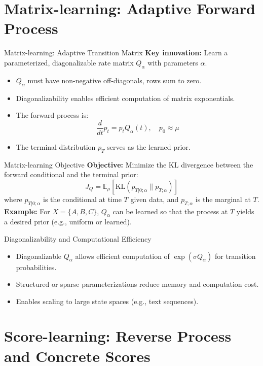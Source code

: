 \documentclass{beamer}
\begin{document}
\section{Matrix-learning: Adaptive Forward Process}

\begin{frame}{Matrix-learning: Adaptive Transition Matrix}
  \textbf{Key innovation:} Learn a parameterized, diagonalizable rate matrix $Q_\alpha$ with parameters $\alpha$.
  \begin{itemize}
    \item $Q_\alpha$ must have non-negative off-diagonals, rows sum to zero.
    \item Diagonalizability enables efficient computation of matrix exponentials.
    \item The forward process is:
      \[
        \frac{d}{dt} p_t = p_t Q_\alpha(t), \quad p_0 \approx \mu
      \]
    \item The terminal distribution $p_T$ serves as the learned prior.
  \end{itemize}
\end{frame}

\begin{frame}{Matrix-learning Objective}
  \textbf{Objective:} Minimize the KL divergence between the forward conditional and the terminal prior:
  \[
    J_Q = \mathbb{E}_\mu \left[ \mathrm{KL}(p_{T|0;\alpha} \| p_{T;\alpha}) \right]
  \]
  where $p_{T|0;\alpha}$ is the conditional at time $T$ given data, and $p_{T;\alpha}$ is the marginal at $T$.
  \vspace{1em}
  \textbf{Example:} For $X = \{A, B, C\}$, $Q_\alpha$ can be learned so that the process at $T$ yields a desired prior (e.g., uniform or learned).
\end{frame}

\begin{frame}{Diagonalizability and Computational Efficiency}
  \begin{itemize}
    \item Diagonalizable $Q_\alpha$ allows efficient computation of $\exp(\sigma Q_\alpha)$ for transition probabilities.
    \item Structured or sparse parameterizations reduce memory and computation cost.
    \item Enables scaling to large state spaces (e.g., text sequences).
  \end{itemize}
\end{frame}

\section{Score-learning: Reverse Process and Concrete Scores}
\end{document}
